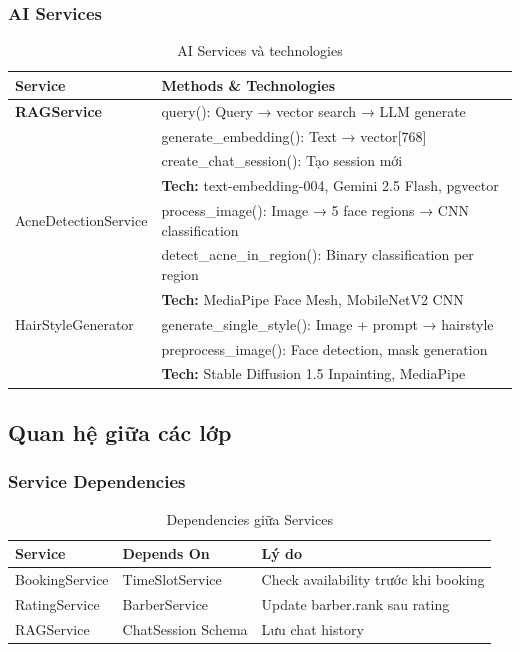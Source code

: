 \subsubsection{AI Services}

\begin{table}[H]
\centering
\caption{AI Services và technologies}
\begin{tabular}{|l|p{10cm}|}
\hline
\textbf{Service} & \textbf{Methods \& Technologies} \\
\hline
\textbf{RAGService} & 
query(): Query → vector search → LLM generate \\
& generate\_embedding(): Text → vector[768] \\
& create\_chat\_session(): Tạo session mới \\
& \textbf{Tech:} text-embedding-004, Gemini 2.5 Flash, pgvector \\
\hline
AcneDetectionService & 
process\_image(): Image → 5 face regions → CNN classification \\
& detect\_acne\_in\_region(): Binary classification per region \\
& \textbf{Tech:} MediaPipe Face Mesh, MobileNetV2 CNN \\
\hline
HairStyleGenerator & 
generate\_single\_style(): Image + prompt → hairstyle \\
& preprocess\_image(): Face detection, mask generation \\
& \textbf{Tech:} Stable Diffusion 1.5 Inpainting, MediaPipe \\
\hline
\end{tabular}
\end{table}

\vspace{0.5cm}

\subsection{Quan hệ giữa các lớp}

\subsubsection{Service Dependencies}

\begin{table}[H]
\centering
\caption{Dependencies giữa Services}
\begin{tabular}{|l|l|p{6cm}|}
\hline
\textbf{Service} & \textbf{Depends On} & \textbf{Lý do} \\
\hline
BookingService & TimeSlotService & Check availability trước khi booking \\
\hline
RatingService & BarberService & Update barber.rank sau rating \\
\hline
RAGService & ChatSession Schema & Lưu chat history \\
\hline
\end{tabular}
\end{table}

